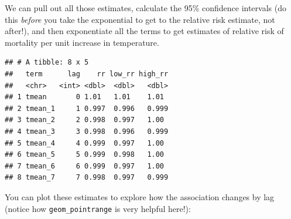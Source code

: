 \documentclass[
]{book}
\newenvironment{Shaded}{\begin{snugshade}}{\end{snugshade}}
\newcommand{\DataTypeTok}[1]{\textcolor[rgb]{0.13,0.29,0.53}{#1}}
\newcommand{\DecValTok}[1]{\textcolor[rgb]{0.00,0.00,0.81}{#1}}
\newcommand{\FloatTok}[1]{\textcolor[rgb]{0.00,0.00,0.81}{#1}}
\newcommand{\KeywordTok}[1]{\textcolor[rgb]{0.13,0.29,0.53}{\textbf{#1}}}
\newcommand{\NormalTok}[1]{#1}
\newcommand{\OperatorTok}[1]{\textcolor[rgb]{0.81,0.36,0.00}{\textbf{#1}}}
\newcommand{\StringTok}[1]{\textcolor[rgb]{0.31,0.60,0.02}{#1}}
\begin{document}
We can pull out all those estimates, calculate the 95\% confidence intervals (do this \emph{before}
you take the exponential to get to the relative risk estimate, not after!), and then
exponentiate all the terms to get estimates of relative risk of mortality per unit increase
in temperature.

\begin{Shaded}
\end{Shaded}

\begin{verbatim}
## # A tibble: 8 x 5
##   term      lag    rr low_rr high_rr
##   <chr>   <int> <dbl>  <dbl>   <dbl>
## 1 tmean       0 1.01   1.01    1.01 
## 2 tmean_1     1 0.997  0.996   0.999
## 3 tmean_2     2 0.998  0.997   1.00 
## 4 tmean_3     3 0.998  0.996   0.999
## 5 tmean_4     4 0.999  0.997   1.00 
## 6 tmean_5     5 0.999  0.998   1.00 
## 7 tmean_6     6 0.999  0.997   1.00 
## 8 tmean_7     7 0.998  0.997   0.999
\end{verbatim}

You can plot these estimates to explore how the association changes by lag (notice how
\texttt{geom\_pointrange} is very helpful here!):
\end{document}

